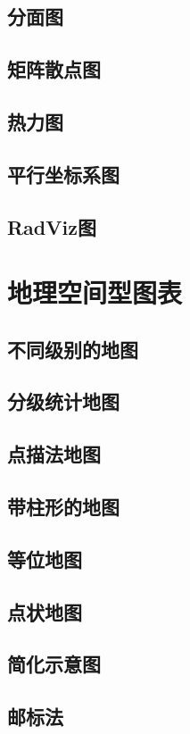 \documentclass[openany]{progbookcn}
\begin{document}
\subsection{分面图}
\subsection{矩阵散点图}
\subsection{热力图}
\subsection{平行坐标系图}
\subsection{RadViz图}

\section{地理空间型图表}
\subsection{不同级别的地图}
\subsection{分级统计地图}
\subsection{点描法地图}
\subsection{带柱形的地图}
\subsection{等位地图}
\subsection{点状地图}
\subsection{简化示意图}
\subsection{邮标法}
\end{document}
